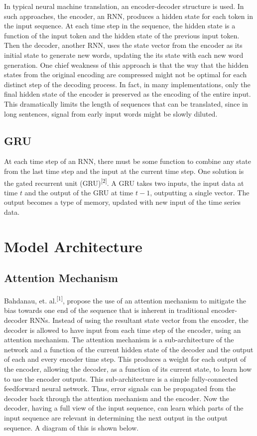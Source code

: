 \documentclass[letterpaper, 10pt]{article}
\begin{document}
\begin{multicols}{2}
In typical neural machine translation, an encoder-decoder structure is used.
In such approaches, the encoder, an RNN, produces a hidden state for each token in the input
sequence.
At each time step in the sequence, the hidden state is a function of the input token and the hidden
state of the previous input token.
Then the decoder, another RNN, uses the state vector from the encoder as its initial state to
generate new words, updating the its state with each new word generation.
One chief weakness of this approach is that the way that the hidden states from the original
encoding are compressed might not be optimal for each distinct step of the decoding process.
In fact, in many implementations, only the final hidden state of the encoder is preserved as the
encoding of the entire input.
This dramatically limits the length of sequences that can be translated, since in long sentences,
signal from early input words might be slowly diluted.

\subsection{GRU}

At each time step of an RNN, there must be some function to combine any state from the last time
step and the input at the current time step.
One solution is the gated recurrent unit (GRU)\textsuperscript{[2]}.
A GRU takes two inputs, the input data at time $t$ and the output of the GRU at time $t-1$, outputting
a single vector.
The output becomes a type of memory, updated with new input of the time series data.

\section{Model Architecture}

\subsection{Attention Mechanism}
Bahdanau, et. al.\textsuperscript{[1]}, propose the use of an attention mechanism to mitigate the bias
towards one end of the sequence that is inherent in traditional encoder-decoder RNNs.
Instead of using the resultant state vector from the encoder, the decoder is allowed to have input
from each time step of the encoder, using an attention mechanism.
The attention mechanism is a sub-architecture of the network and a function of the current hidden
state of the decoder and the output of each and every encoder time step.
This produces a weight for each output of the encoder, allowing the decoder, as a function of its
current state, to learn how to use the encoder outputs.
This sub-architecture is a simple fully-connected feedforward neural network.
Thus, error signals can be propagated from the decoder back through the attention mechanism and
the encoder.
Now the decoder, having a full view of the input sequence, can learn which parts of the input
sequence are relevant in determining the next output in the output sequence.
A diagram of this is shown below.


\end{multicols}
\end{document}
